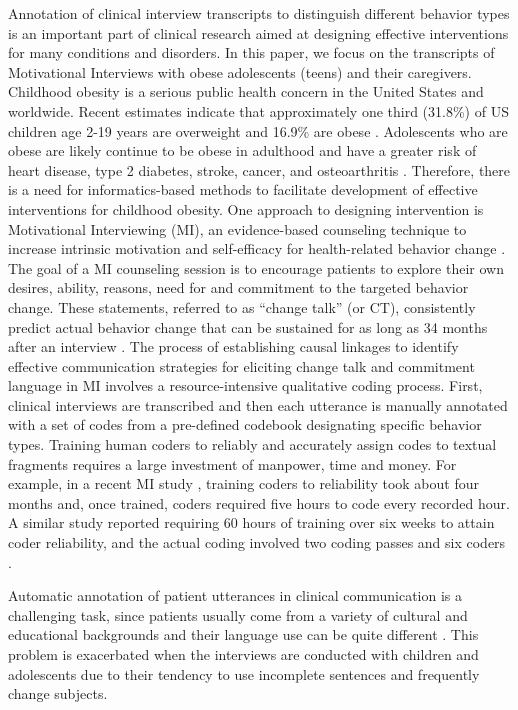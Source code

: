 \documentclass{amia}
\begin{document}
Annotation of clinical interview transcripts to distinguish different behavior types is an important part of clinical research aimed at designing effective interventions for many conditions and disorders. In this paper, we focus on the transcripts of Motivational Interviews with obese adolescents (teens) and their caregivers. Childhood obesity is a serious public health concern in the United States and worldwide. Recent estimates indicate that approximately one third (31.8\%) of US children age 2-19 years are overweight and 16.9\% are obese \citep{01}. Adolescents who are obese are likely continue to be obese in adulthood and have a greater risk of heart disease, type 2 diabetes, stroke, cancer, and osteoarthritis \citep{02}. Therefore, there is a need for informatics-based methods to facilitate development of effective interventions for childhood obesity. One approach to designing intervention is Motivational Interviewing (MI), an evidence-based counseling technique to increase intrinsic motivation and self-efficacy for health-related behavior change \citep{03,04}. The goal of a MI counseling session is to encourage patients to explore their own desires, ability, reasons, need for and commitment to the targeted behavior change. These statements, referred to as ``change talk'' (or CT), consistently predict actual behavior change \citep{05} that can be sustained for as long as 34 months after an interview \citep{06}. The process of establishing causal linkages to identify effective communication strategies for eliciting change talk and commitment language in MI involves a resource-intensive qualitative coding process. First, clinical interviews are transcribed and then each utterance is manually annotated with a set of codes from a pre-defined codebook designating specific behavior types. Training human coders to reliably and accurately assign codes to textual fragments requires a large investment of manpower, time and money. For example, in a recent MI study \citep{07}, training coders to reliability took about four months and, once trained, coders required five hours to code every recorded hour. A similar study reported requiring 60 hours of training over six weeks to attain coder reliability, and the actual coding involved two coding passes and six coders \citep{08}.

Automatic annotation of patient utterances in clinical communication is a challenging task, since patients usually come from a variety of cultural and educational backgrounds and
their language use can be quite different \citep{09}. This problem is exacerbated when the interviews are conducted with children and adolescents due to their tendency to use
incomplete sentences and frequently change subjects.
\end{document}
